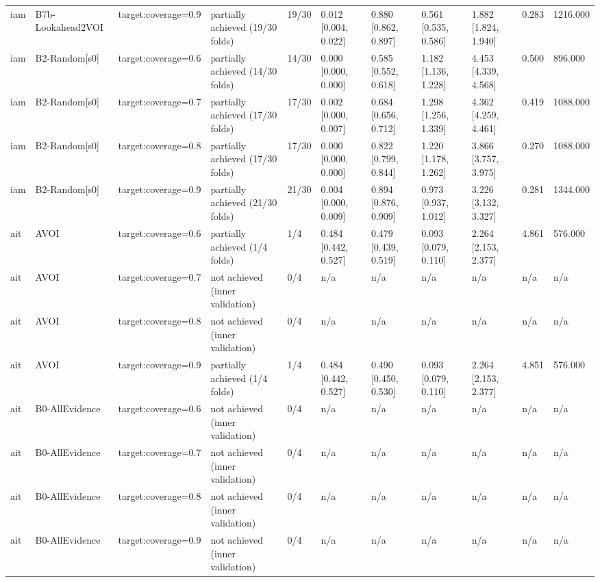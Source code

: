 \begin{table}[!ht]
{\begin{tabular}{lllllllllll}
iam & B7b-Lookahead2VOI & target:coverage=0.9 & partially achieved (19/30 folds) & 19/30 & 0.012 [0.004, 0.022] & 0.880 [0.862, 0.897] & 0.561 [0.535, 0.586] & 1.882 [1.824, 1.940] & 0.283 & 1216.000 \\
iam & B2-Random[s0] & target:coverage=0.6 & partially achieved (14/30 folds) & 14/30 & 0.000 [0.000, 0.000] & 0.585 [0.552, 0.618] & 1.182 [1.136, 1.228] & 4.453 [4.339, 4.568] & 0.500 & 896.000 \\
iam & B2-Random[s0] & target:coverage=0.7 & partially achieved (17/30 folds) & 17/30 & 0.002 [0.000, 0.007] & 0.684 [0.656, 0.712] & 1.298 [1.256, 1.339] & 4.362 [4.259, 4.461] & 0.419 & 1088.000 \\
iam & B2-Random[s0] & target:coverage=0.8 & partially achieved (17/30 folds) & 17/30 & 0.000 [0.000, 0.000] & 0.822 [0.799, 0.844] & 1.220 [1.178, 1.262] & 3.866 [3.757, 3.975] & 0.270 & 1088.000 \\
iam & B2-Random[s0] & target:coverage=0.9 & partially achieved (21/30 folds) & 21/30 & 0.004 [0.000, 0.009] & 0.894 [0.876, 0.909] & 0.973 [0.937, 1.012] & 3.226 [3.132, 3.327] & 0.281 & 1344.000 \\
ait & AVOI & target:coverage=0.6 & partially achieved (1/4 folds) & 1/4 & 0.484 [0.442, 0.527] & 0.479 [0.439, 0.519] & 0.093 [0.079, 0.110] & 2.264 [2.153, 2.377] & 4.861 & 576.000 \\
ait & AVOI & target:coverage=0.7 & not achieved (inner validation) & 0/4 & n/a & n/a & n/a & n/a & n/a & n/a \\
ait & AVOI & target:coverage=0.8 & not achieved (inner validation) & 0/4 & n/a & n/a & n/a & n/a & n/a & n/a \\
ait & AVOI & target:coverage=0.9 & partially achieved (1/4 folds) & 1/4 & 0.484 [0.442, 0.527] & 0.490 [0.450, 0.530] & 0.093 [0.079, 0.110] & 2.264 [2.153, 2.377] & 4.851 & 576.000 \\
ait & B0-AllEvidence & target:coverage=0.6 & not achieved (inner validation) & 0/4 & n/a & n/a & n/a & n/a & n/a & n/a \\
ait & B0-AllEvidence & target:coverage=0.7 & not achieved (inner validation) & 0/4 & n/a & n/a & n/a & n/a & n/a & n/a \\
ait & B0-AllEvidence & target:coverage=0.8 & not achieved (inner validation) & 0/4 & n/a & n/a & n/a & n/a & n/a & n/a \\
ait & B0-AllEvidence & target:coverage=0.9 & not achieved (inner validation) & 0/4 & n/a & n/a & n/a & n/a & n/a & n/a \\

\end{tabular}}
\end{table}
